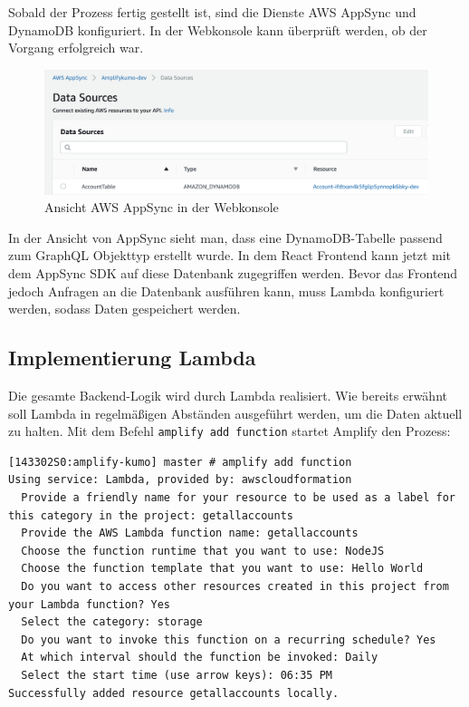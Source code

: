 Sobald der Prozess fertig gestellt ist, sind die Dienste AWS AppSync und DynamoDB konfiguriert.
In der Webkonsole kann überprüft werden, ob der Vorgang erfolgreich war.

\begin{figure}[htbp]
    \centering
    \includegraphics[width=1.0\textwidth]{50-Implementierung/AppSync-DynamoDB.png}
    \caption{Ansicht AWS AppSync in der Webkonsole}
    \label{fig:meine-grafik}
\end{figure}

In der Ansicht von AppSync sieht man, dass eine DynamoDB-Tabelle passend zum GraphQL Objekttyp erstellt wurde.
In dem React Frontend kann jetzt mit dem AppSync SDK auf diese Datenbank zugegriffen werden.
Bevor das Frontend jedoch Anfragen an die Datenbank ausführen kann, muss Lambda konfiguriert werden, sodass Daten gespeichert werden.

\subsection{Implementierung Lambda}
Die gesamte Backend-Logik wird durch Lambda realisiert.
Wie bereits erwähnt soll Lambda in regelmäßigen Abständen ausgeführt werden, um die Daten aktuell zu halten.
Mit dem Befehl \verb+amplify add function+ startet Amplify den Prozess:

\begin{verbatim}
[143302S0:amplify-kumo] master # amplify add function
Using service: Lambda, provided by: awscloudformation
  Provide a friendly name for your resource to be used as a label for this category in the project: getallaccounts
  Provide the AWS Lambda function name: getallaccounts
  Choose the function runtime that you want to use: NodeJS
  Choose the function template that you want to use: Hello World
  Do you want to access other resources created in this project from your Lambda function? Yes
  Select the category: storage
  Do you want to invoke this function on a recurring schedule? Yes
  At which interval should the function be invoked: Daily
  Select the start time (use arrow keys): 06:35 PM
Successfully added resource getallaccounts locally.
\end{verbatim}

